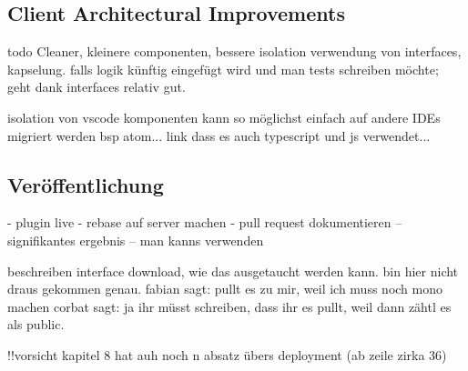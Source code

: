 \subsection{Client Architectural Improvements}
todo
Cleaner, kleinere componenten, bessere isolation
verwendung von interfaces, kapselung. falls logik künftig eingefügt wird und man tests schreiben möchte; geht dank interfaces relativ gut.

isolation von vscode komponenten
kann so möglichst einfach auf andere IDEs migriert werden
bsp atom... link dass es auch typescript und js verwendet...

\subsection{Veröffentlichung}
- plugin live
- rebase auf server machen
- pull request dokumentieren -- signifikantes ergebnis -- man kanns verwenden

beschreiben interface download, wie das ausgetaucht werden kann.
bin hier nicht draus gekommen genau.
fabian sagt: pullt es zu mir, weil ich muss noch mono machen
corbat sagt: ja ihr müsst schreiben, dass ihr es pullt, weil dann zähtl es als public.

!!vorsicht kapitel 8 hat auh noch n absatz übers deployment (ab zeile zirka 36)